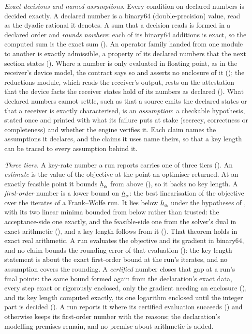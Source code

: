 \emph{Exact decisions and named assumptions.} Every condition on declared
numbers is decided exactly. A declared number is a binary64
(double-precision) value, read as the dyadic rational it denotes. A sum that
a decision reads is formed in a declared order and \emph{rounds nowhere}:
each of its binary64 additions is exact, so the computed sum is the exact sum
(). An operator family handed from
one module to another is exactly admissible, a property of its declared
numbers that the next section states
(). Where a number is only evaluated
in floating point, as in the receiver's device model, the contract says so
and asserts no enclosure of it (); the reductions
module, which reads the receiver's output, rests on the attestation that the
device facts the receiver states hold of its numbers as declared
(). What declared numbers cannot settle, such as
that a source emits the declared states or that a receiver is exactly
characterised, is an \emph{assumption}: a checkable hypothesis, stated once
and printed with what its failure puts at stake (secrecy, correctness or
completeness) and whether the engine verifies it. Each claim names the
assumptions it declares, and the claims it uses name theirs, so that a key
length can be traced to every assumption behind it.

\emph{Three tiers.} A key-rate number a run reports carries one of three
tiers (). An \emph{estimate} is the value of the
objective at the point an optimiser returned. At an exactly feasible point it
bounds $\underline{h}_{\alpha}$ from above (), so it backs no key
length. A \emph{first-order} number is a lower bound on $\underline{h}_{\alpha}$: the best
linearisation of the objective over the iterates of a Frank--Wolfe run. It
lies below $\underline{h}_{\alpha}$ under the hypotheses of
, with its two linear minima
bounded from below rather than trusted: the acceptance-side one exactly, and
the feasible-side one from the solver's dual in exact arithmetic
(), and a key length
follows from it (). That theorem
holds in exact real arithmetic. A run evaluates the objective and its
gradient in binary64, and no claim bounds the rounding error of that
evaluation (): the key-length
statement is about the exact first-order bound at the run's iterates, and no
assumption covers the rounding. A \emph{certified} number closes that gap at
a run's final points: the same bound formed again from the declaration's
exact data, every step exact or rigorously enclosed, only the gradient
needing an enclosure (),
and its key length computed exactly, its one logarithm enclosed until the
integer part is decided
(). A run reports it
where its certified evaluation succeeds
() and otherwise keeps
its first-order number with the reasons; the declaration's modelling
premises remain, and no premise about arithmetic is added.

